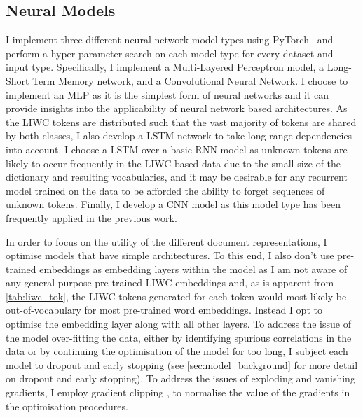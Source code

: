 \subsection{Neural Models}\label{sec:redux_neural}
I implement three different neural network model types using PyTorch~\citep{Paszke:2019} and perform a hyper-parameter search on each model type for every dataset and input type. 
Specifically, I implement a Multi-Layered Perceptron model, a Long-Short Term Memory network, and a Convolutional Neural Network.
I choose to implement an MLP as it is the simplest form of neural networks and it can provide insights into the applicability of neural network based architectures.
As the LIWC tokens are distributed such that the vast majority of tokens are shared by both classes, I also develop a LSTM network to take long-range dependencies into account.
I choose a LSTM over a basic RNN model as unknown tokens are likely to occur frequently in the LIWC-based data due to the small size of the dictionary and resulting vocabularies, and it may be desirable for any recurrent model trained on the data to be afforded the ability to forget sequences of unknown tokens.
Finally, I develop a CNN model as this model type has been frequently applied in the previous work.

In order to focus on the utility of the different document representations, I optimise models that have simple architectures. 
To this end, I also don't use pre-trained embeddings as embedding layers within the model as I am not aware of any general purpose pre-trained LIWC-embeddings and, as is apparent from \cref{tab:liwc_tok}, the LIWC tokens generated for each token would most likely be out-of-vocabulary for most pre-trained word embeddings.
Instead I opt to optimise the embedding layer along with all other layers.
To address the issue of the model over-fitting the data, either by identifying spurious correlations in the data or by continuing the optimisation of the model for too long, I subject each model to dropout and early stopping (see \cref{sec:model_background} for more detail on dropout and early stopping).
To address the issues of exploding and vanishing gradients, I employ gradient clipping \citep{Bengio:1994}, to normalise the value of the gradients in the optimisation procedures.

